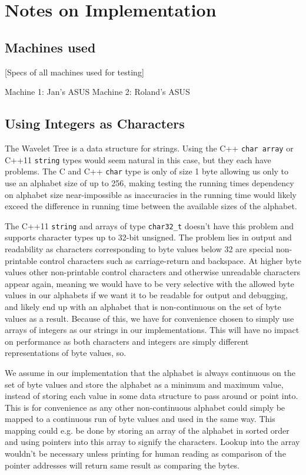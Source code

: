 \section{Notes on Implementation}

\subsection{Machines used}
[Specs of all machines used for testing]

Machine 1: Jan's ASUS
Machine 2: Roland's ASUS

\subsection{Using Integers as Characters}
\label{sec:UsingIntAsChar}
The Wavelet Tree is a data structure for strings. Using the C++ \texttt{char array} or C++11 \texttt{string} types would seem natural in this case, but they each have problems.
The C and C++ \texttt{char} type is only of size 1 byte allowing us only to use an alphabet size of up to 256, making testing the running times dependency on alphabet size near-impossible as inaccuracies in the running time would likely exceed the difference in running time between the available sizes of the alphabet.

The C++11 \texttt{string} and arrays of type \texttt{char32\_t} doesn't have this problem and supports character types up to 32-bit unsigned. The problem lies in output and readability as characters corresponding to byte values below 32 are special non-printable control characters such as carriage-return and backspace. At higher byte values other non-printable control characters and otherwise unreadable characters appear again, meaning we would have to be very selective with the allowed byte values in our alphabets if we want it to be readable for output and debugging, and likely end up with an alphabet that is non-continuous on the set of byte values as a result.
Because of this, we have for convenience chosen to simply use arrays of integers as our strings in our implementations.
This will have no impact on performance as both characters and integers are simply different representations of byte values, so.

We assume in our implementation that the alphabet is always continuous on the set of byte values and store the alphabet as a minimum and maximum value, instead of storing each value in some data structure to pass around or point into.
This is for convenience as any other non-continuous alphabet could simply be mapped to a continuous run of byte values and used in the same way. 
This mapping could e.g. be done by storing an array of the alphabet in sorted order and using pointers into this array to signify the characters. 
Lookup into the array wouldn't be necessary unless printing for human reading as comparison of the pointer addresses will return same result as comparing the bytes.

